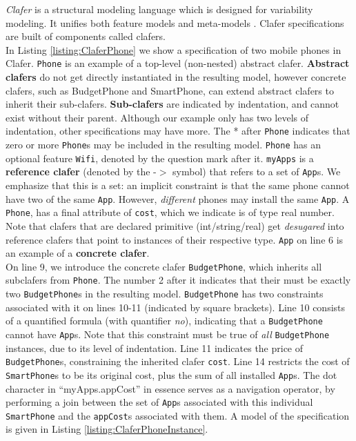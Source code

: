 \documentclass{easychair}
\newcommand{\eg}{\emph{e.g.}\xspace}
\begin{document}
\emph{Clafer} is a structural modeling language which is designed for variability modeling. It unifies both feature models  and meta-models \cite{BakClaferSLE2010}. Clafer specifications are built of components called clafers. \\
%
\indent In Listing \ref{listing:ClaferPhone}  we show a specification of two mobile phones in Clafer. 
%
 \texttt{Phone} is an example of a top-level (non-nested) abstract clafer. \textbf{Abstract clafers} do not get directly instantiated in the resulting model, however concrete clafers, such as BudgetPhone and SmartPhone, can extend abstract clafers to inherit their sub-clafers. \textbf{Sub-clafers} are indicated by indentation, and cannot exist without their parent. Although our example only has two levels of indentation, other specifications may have more. The * after \texttt{Phone} indicates that zero or more \texttt{Phone}s may be included in the resulting model. \texttt{Phone} has an optional feature \texttt{Wifi}, denoted by the question mark after it. \texttt{myApps} is a \textbf{reference clafer} (denoted by the  -$>$ symbol) that refers  to a set of \texttt{App}s. We emphasize that this is a set: an implicit constraint is that the same phone cannot have two of the same \texttt{App}. However, \textit{different} phones may install the same \texttt{App}. A \texttt{Phone}, has a final attribute of \texttt{cost}, which we indicate is of type real number. Note that clafers that are declared primitive (int/string/real) get \textit{desugared} into reference clafers that point to instances of their respective type. \texttt{App} on line 6 is an example of a \textbf{concrete clafer}.\\
%
\indent On line 9, we introduce the concrete clafer \texttt{BudgetPhone}, which inherits all subclafers from \texttt{Phone}. The number 2 after it indicates that their must be exactly two \texttt{BudgetPhone}s in the resulting model. \texttt{BudgetPhone} has two constraints associated with it on lines 10-11 (indicated by square brackets). Line 10 consists of a quantified formula (with quantifier \textit{no}), indicating that a \texttt{BudgetPhone} cannot have \texttt{App}s. Note that this constraint must be true of \textit{all} \texttt{BudgetPhone} instances, due to its level of indentation. Line 11 indicates the price of \texttt{BudgetPhone}s, constraining the inherited clafer \texttt{cost}. Line 14 restricts the cost of \texttt{SmartPhone}s to be its original cost, plus the sum of all installed \texttt{App}s. The dot character in ``myApps.appCost''  in essence serves as a navigation operator, by performing a join between the set of \texttt{App}s associated with this individual \texttt{SmartPhone} and the \texttt{appCost}s associated with them. A model of the specification is given in Listing \ref{listing:ClaferPhoneInstance}.\\ %
\end{document}

